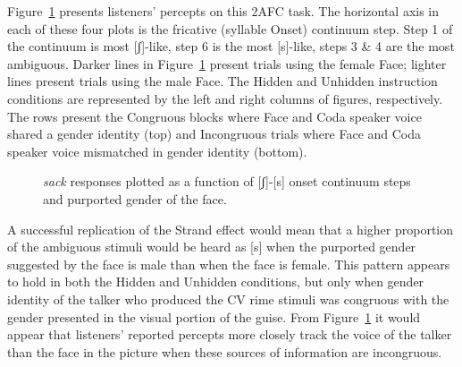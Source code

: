 \documentclass[
  letterpaper,
  DIV=11,
  numbers=noendperiod]{scrartcl}
\begin{document}
Figure~\ref{fig-scurve} presents listeners' percepts on this 2AFC task.
The horizontal axis in each of these four plots is the fricative
(syllable Onset) continuum step. Step 1 of the continuum is most
{[}ʃ{]}-like, step 6 is the most {[}s{]}-like, steps 3 \& 4 are the most
ambiguous. Darker lines in Figure~\ref{fig-scurve} present trials using
the female Face; lighter lines present trials using the male Face. The
Hidden and Unhidden instruction conditions are represented by the left
and right columns of figures, respectively. The rows present the
Congruous blocks where Face and Coda speaker voice shared a gender
identity (top) and Incongruous trials where Face and Coda speaker voice
mismatched in gender identity (bottom).

\begin{figure}


\caption{\label{fig-scurve}\emph{sack} responses plotted as a function
of {[}ʃ{]}-{[}s{]} onset continuum steps and purported gender of the
face.}

\end{figure}%

A successful replication of the Strand effect would mean that a higher
proportion of the ambiguous stimuli would be heard as {[}s{]} when the
purported gender suggested by the face is male than when the face is
female. This pattern appears to hold in both the Hidden and Unhidden
conditions, but only when gender identity of the talker who produced the
CV rime stimuli was congruous with the gender presented in the visual
portion of the guise. From Figure~\ref{fig-scurve} it would appear that
listeners' reported percepts more closely track the voice of the talker
than the face in the picture when these sources of information are
incongruous.
\end{document}
